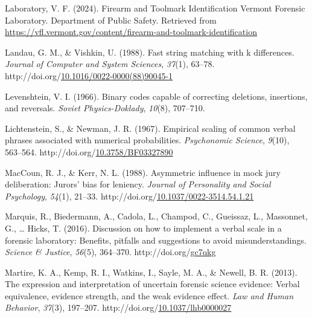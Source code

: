 \documentclass[print]{nuthesis}
\newlength{\cslhangindent}
\newenvironment{CSLReferences}[2]%
{\setlength{\parindent}{0pt}%
\everypar{\setlength{\hangindent}{\cslhangindent}}\ignorespaces}%
{\par}
\begin{document}
\begin{CSLReferences}{1}{0}
\leavevmode{}%
Laboratory, V. F. (2024). Firearm and {Toolmark} {Identification} {\textbar} {Vermont} {Forensic} {Laboratory}. Department of Public Safety. Retrieved from \url{https://vfl.vermont.gov/content/firearm-and-toolmark-identification}

\leavevmode{}%
Landau, G. M., \& Vishkin, U. (1988). Fast string matching with k differences. \emph{Journal of Computer and System Sciences}, \emph{37}(1), 63--78. http://doi.org/\href{https://doi.org/10.1016/0022-0000(88)90045-1}{10.1016/0022-0000(88)90045-1}

\leavevmode{}%
Levenshtein, V. I. (1966). Binary codes capable of correcting deletions, insertions, and reversals. \emph{Soviet Physics-Doklady}, \emph{10}(8), 707--710.

\leavevmode{}%
Lichtenstein, S., \& Newman, J. R. (1967). Empirical scaling of common verbal phrases associated with numerical probabilities. \emph{Psychonomic Science}, \emph{9}(10), 563--564. http://doi.org/\href{https://doi.org/10.3758/BF03327890}{10.3758/BF03327890}

\leavevmode{}%
MacCoun, R. J., \& Kerr, N. L. (1988). Asymmetric influence in mock jury deliberation: {Jurors}' bias for leniency. \emph{Journal of Personality and Social Psychology}, \emph{54}(1), 21--33. http://doi.org/\href{https://doi.org/10.1037/0022-3514.54.1.21}{10.1037/0022-3514.54.1.21}

\leavevmode{}%
Marquis, R., Biedermann, A., Cadola, L., Champod, C., Gueissaz, L., Massonnet, G., \ldots{} Hicks, T. (2016). Discussion on how to implement a verbal scale in a forensic laboratory: {Benefits}, pitfalls and suggestions to avoid misunderstandings. \emph{Science \& Justice}, \emph{56}(5), 364--370. http://doi.org/\href{https://doi.org/gc7qkg}{gc7qkg}

\leavevmode{}%
Martire, K. A., Kemp, R. I., Watkins, I., Sayle, M. A., \& Newell, B. R. (2013). The expression and interpretation of uncertain forensic science evidence: {Verbal} equivalence, evidence strength, and the weak evidence effect. \emph{Law and Human Behavior}, \emph{37}(3), 197--207. http://doi.org/\href{https://doi.org/10.1037/lhb0000027}{10.1037/lhb0000027}


\end{CSLReferences}
\end{document}
